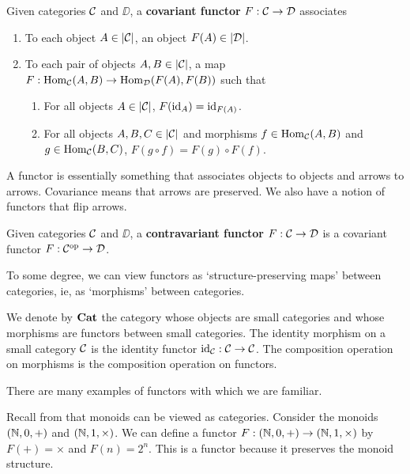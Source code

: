\begin{boxdefinition}
    Given categories $\mathcal{C}$ and $\DD$, a \textbf{covariant functor} $F : \mathcal{C} \to \mathcal{D}$ associates
    \begin{enumerate}
        \item To each object $A \in \left\lvert \mathcal{C} \right\rvert$, an object $F(A) \in \left\lvert \mathcal{D} \right\rvert$.
        \item To each pair of objects $A, B \in \left\lvert \mathcal{C} \right\rvert$, a map $F : \operatorname{Hom}_{\mathcal{C}}\!\left( A, B \right) \to \operatorname{Hom}_{\mathcal{D}}\!\left( F(A), F(B) \right)$ such that
        \begin{enumerate}[noitemsep, label = (\roman*)]
            \item For all objects $A \in \left\lvert \mathcal{C} \right\rvert$, $F(\operatorname{id}_A) = \operatorname{id}_{F(A)}$.
            \item For all objects $A, B, C \in \left\lvert \mathcal{C} \right\rvert$ and morphisms $f \in \operatorname{Hom}_{\mathcal{C}}\!\left( A, B \right)$ and $g \in \operatorname{Hom}_{\mathcal{C}}\!\left( B, C \right)$, $F(g \circ f) = F(g) \circ F(f)$.
        \end{enumerate}
    \end{enumerate}
\end{boxdefinition}

A functor is essentially something that associates objects to objects and arrows to arrows. Covariance means that arrows are preserved. We also have a notion of functors that flip arrows.

\begin{boxdefinition}
    Given categories $\mathcal{C}$ and $\DD$, a \textbf{contravariant functor} $F : \mathcal{C} \to \mathcal{D}$ is a covariant functor $F : \mathcal{C}^{\operatorname{op}} \to \mathcal{D}$.
\end{boxdefinition}

To some degree, we can view functors as `structure-preserving maps' between categories, ie, as `morphisms' between categories.

\begin{boxexample}
    We denote by $\mathbf{Cat}$ the category whose objects are small categories and whose morphisms are functors between small categories. The identity morphism on a small category $\mathcal{C}$ is the identity functor $\operatorname{id}_{\mathcal{C}} : \mathcal{C} \to \mathcal{C}$. The composition operation on morphisms is the composition operation on functors.
\end{boxexample}

There are many examples of functors with which we are familiar.

\begin{boxexample}
    Recall from  that monoids can be viewed as categories. Consider the monoids $\left( \mathbb{N}, 0, + \right)$ and $\left( \mathbb{N}, 1, \times \right)$. We can define a functor $F : \left( \mathbb{N}, 0, + \right) \to \left( \mathbb{N}, 1, \times \right)$ by $F(+) = \times$ and $F(n) = 2^n$. This is a functor because it preserves the monoid structure.
\end{boxexample}

